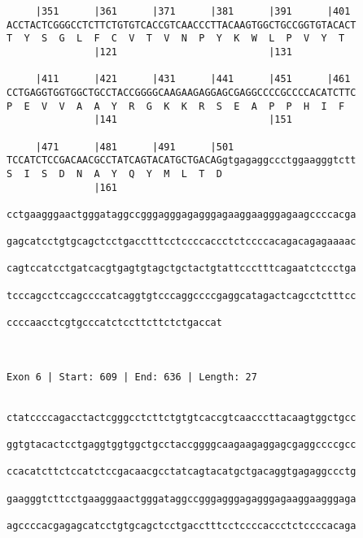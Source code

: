 \documentclass{article}
\begin{document}
\begin{Verbatim}
     |351      |361      |371      |381      |391      |401 
ACCTACTCGGGCCTCTTCTGTGTCACCGTCAACCCTTACAAGTGGCTGCCGGTGTACACT
T  Y  S  G  L  F  C  V  T  V  N  P  Y  K  W  L  P  V  Y  T  
               |121                          |131           
  
     |411      |421      |431      |441      |451      |461 
CCTGAGGTGGTGGCTGCCTACCGGGGCAAGAAGAGGAGCGAGGCCCCGCCCCACATCTTC
P  E  V  V  A  A  Y  R  G  K  K  R  S  E  A  P  P  H  I  F  
               |141                          |151           
  
     |471      |481      |491      |501                     
TCCATCTCCGACAACGCCTATCAGTACATGCTGACAGgtgagaggccctggaagggtctt
S  I  S  D  N  A  Y  Q  Y  M  L  T  D                       
               |161                                         
  
cctgaagggaactgggataggccgggagggagagggagaaggaagggagaagccccacga
                                                            
gagcatcctgtgcagctcctgacctttcctccccaccctctccccacagacagagaaaac
                                                            
cagtccatcctgatcacgtgagtgtagctgctactgtattccctttcagaatctccctga
                                                            
tcccagcctccagccccatcaggtgtcccaggccccgaggcatagactcagcctctttcc
                                                            
ccccaacctcgtgcccatctccttcttctctgaccat
                                     
                                     
 
Exon 6 | Start: 609 | End: 636 | Length: 27


ctatccccagacctactcgggcctcttctgtgtcaccgtcaacccttacaagtggctgcc
                                                            
ggtgtacactcctgaggtggtggctgcctaccggggcaagaagaggagcgaggccccgcc
                                                            
ccacatcttctccatctccgacaacgcctatcagtacatgctgacaggtgagaggccctg
                                                            
gaagggtcttcctgaagggaactgggataggccgggagggagagggagaaggaagggaga
                                                            
agccccacgagagcatcctgtgcagctcctgacctttcctccccaccctctccccacaga
                                                            

\end{Verbatim}
\end{document}
